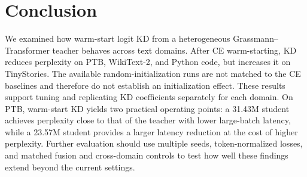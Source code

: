 \documentclass[conference]{IEEEtran}
\begin{document}

\section{Conclusion}

We examined how warm-start logit KD from a heterogeneous
Grassmann--Transformer teacher behaves across text domains.  After CE
warm-starting, KD
reduces perplexity on PTB, WikiText-2, and Python code, but increases it on
TinyStories.  The available random-initialization runs are not matched to the
CE baselines and therefore do not establish an initialization effect.  These
results support tuning and replicating KD coefficients separately for each
domain.  On PTB, warm-start KD yields two practical operating points: a
31.43M student achieves perplexity close to that of the teacher with lower
large-batch latency, while a 23.57M student provides a larger latency
reduction at the cost of higher perplexity.  Further evaluation should use
multiple seeds, token-normalized losses, and matched fusion and cross-domain
controls to test how well these findings extend beyond the current settings.



\end{document}
